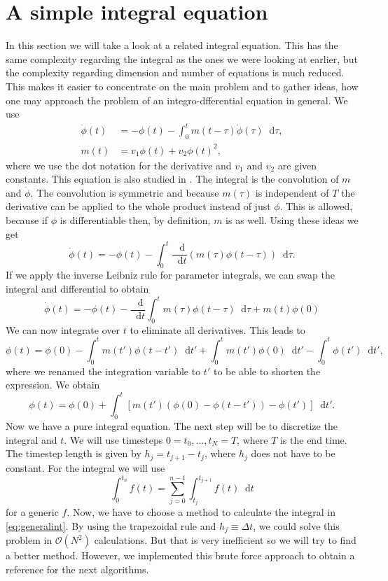 \documentclass[12pt,a4paper,twoside, open=right]{scrreprt}
\theoremstyle{definition}
\theoremstyle{plain}
\newcommand{\D}{\mathop{}\!\mathrm{d}}
\begin{document}
\section{A simple integral equation}
In this section we will take a look at a related integral equation. This has the same complexity regarding the integral as the ones we were looking at earlier, but the complexity regarding dimension and number of equations is much reduced. This makes it easier to concentrate on the main problem and to gather ideas, how one may approach the problem of an integro-dfferential equation in general. We use 
\begin{align}
   \dot\phi(t)&=-\phi(t)-\int_0^tm(t-\tau)\dot\phi(\tau)\D\tau,\\
   m(t)&=v_1\phi(t)+v_2\phi(t)^2,
\end{align}
where we use the dot notation for the derivative and $v_1$ and $v_2$ are given constants. This equation is also studied in \cite{Goetze1995}.
The integral is the convolution of $m$ and $\dot\phi$. The convolution is symmetric and because $m(\tau)$ is independent of $T$ the derivative can be applied to the whole product instead of just $\phi$. This is allowed, because if $\phi$ is differentiable then, by definition, $m$ is as well. Using these ideas we get
\begin{equation}
    \dot\phi(t)=-\phi(t)-\int_0^t\frac{\D}{\D t}(m(\tau)\phi(t-\tau))\D\tau.
\end{equation}
If we apply the inverse Leibniz rule for parameter integrals, we can swap the integral and differential to obtain
\begin{equation}
    \dot\phi(t)=-\phi(t) -\frac{\D}{\D t}\int_0^t m(\tau)\phi(t-\tau)\D\tau +m(t)\phi(0)
\end{equation}
We can now integrate over $t$ to eliminate all derivatives. This leads to 
\begin{equation}
    \phi(t)=\phi(0)-\int_0^tm(t')\phi(t-t')\D t' +\int_0^tm(t')\phi(0)\D t' -\int_0^t\phi(t')\D t',
\end{equation}
where we renamed the integration variable to $t'$ to be able to shorten the expression. We obtain
\begin{equation}
    \phi(t)=\phi(0)+\int_0^t[m(t')(\phi(0)-\phi(t-t'))-\phi(t')]\D t'.\label{eq:phianalytic}
\end{equation}
Now we have a pure integral equation. The next step will be to discretize the integral and $t$.
We will use timesteps $0=t_0,\dotsc,t_N=T$, where $T$ is the end time. The timestep length is given by $h_j=t_{j+1}-t_j$, where $h_j$ does not have to be constant. For the integral we will use 
\begin{equation}
    \int_0^{t_n}f(t)=\sum_{j=0}^{n-1}\int_{t_j}^{t_{j+1}}f(t)\D t\label{eq:generalint}
\end{equation}
for a generic $f$. Now, we have to choose a method to calculate the integral in \eqref{eq:generalint}. By using the trapezoidal rule and $h_j\equiv \Delta t$, we could solve this problem in $\mathcal{O}(N^2)$ calculations. But that is very inefficient so we will try to find a better method. However, we implemented this brute force approach to obtain a reference for the next algorithms.
\end{document}
